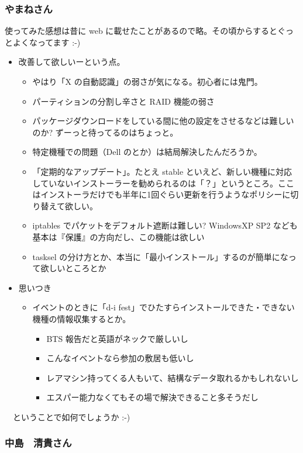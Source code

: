 \documentclass[mingoth]{jsarticle}
\begin{document}
\subsubsection{やまねさん}

使ってみた感想は昔に web に載せたことがあるので略。その頃からするとぐっとよくなってます :-)

\begin{itemize}
 \item 改善して欲しいーという点。
       \begin{itemize}
	\item やはり「X の自動認識」の弱さが気になる。初心者には鬼門。
	\item パーティションの分割し辛さと RAID 機能の弱さ
	\item パッケージダウンロードをしている間に他の設定をさせるなどは難しいのか? ずーっと待ってるのはちょっと。
	\item 特定機種での問題（Dell のとか）は結局解決したんだろうか。
	\item 「定期的なアップデート」。たとえ stable といえど、新しい機種に対応していないインストーラーを勧められるのは「？」というところ。ここはインストーラだけでも半年に1回ぐらい更新を行うようなポリシーに切り替えて欲しい。
	\item iptables でパケットをデフォルト遮断は難しい? WindowsXP SP2 なども基本は『保護』の方向だし、この機能は欲しい
	\item tasksel の分け方とか、本当に「最小インストール」するのが簡単になって欲しいところとか
       \end{itemize}
 \item 思いつき
       \begin{itemize}
	\item
イベントのときに「d-i fest」でひたすらインストールできた・できない機種の情報収集するとか。
	     \begin{itemize}
	      \item
		   BTS 報告だと英語がネックで厳しいし
	      \item こんなイベントなら参加の敷居も低いし
	      \item レアマシン持ってくる人もいて、結構なデータ取れるかもしれないし
	      \item エスパー能力なくてもその場で解決できること多そうだし
	     \end{itemize}
       \end{itemize}
\end{itemize}
　ということで如何でしょうか :-)


\subsubsection{中島　清貴さん}
\end{document}
